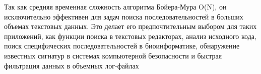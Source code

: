 \documentclass[12pt]{article}
\begin{document}
Так как средняя временная сложность алгоритма Бойера-Мура O(N), он исключительно эффективен для задач поиска последовательностей в больших объемах текстовых данных. Это делает его предпочтительным выбором для таких приложений, как функции поиска в текстовых редакторах, анализ исходного кода, поиск специфических последовательностей в биоинформатике, обнаружение известных сигнатур в системах компьютерной безопасности и быстрая фильтрация данных в объемных лог-файлах
\end{document}
